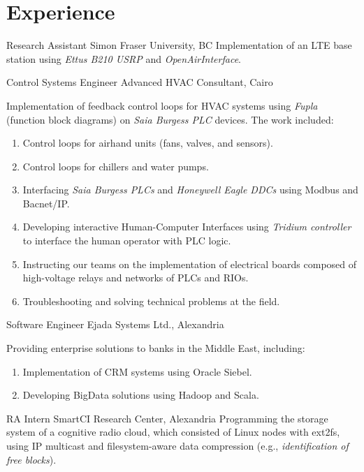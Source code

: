 \documentclass[letterpaper]{twentysecondcv} %
\begin{document}
\section{Experience}

\begin{twenty}
               {Research Assistant}
               {Simon Fraser University, BC}
               {Implementation of an LTE base station using \textit{Ettus B210 USRP} and \textit{OpenAirInterface}.
               }

               {Control Systems Engineer}
               {Advanced HVAC Consultant, Cairo}
               {Implementation of feedback control loops for HVAC systems using \textit{Fupla} (function block diagrams) on 
                \textit{Saia Burgess PLC} devices. The work included:
                \begin{enumerate}
                    \item{Control loops for airhand units (fans, valves, and sensors).}
                    \item{Control loops for chillers and water pumps.}
                    \item{Interfacing \textit{Saia Burgess PLCs} and \textit{Honeywell Eagle DDCs} using 
                          Modbus and Bacnet/IP.}
                    \item{Developing interactive Human-Computer Interfaces using \textit{Tridium controller}
                          to interface the human operator with PLC logic.}
                    \item{Instructing our teams on the implementation of electrical boards composed of
                          high-voltage relays and networks of PLCs and RIOs.}
                    \item{Troubleshooting and solving technical problems at the field.}
                \end{enumerate}
               }

               {Software Engineer}
               {Ejada Systems Ltd., Alexandria}
               {Providing enterprise solutions to banks in the Middle East, including:
                \begin{enumerate}
                    \item Implementation of CRM systems using Oracle Siebel.
                    \item Developing BigData solutions using Hadoop and Scala.
                \end{enumerate}}

               {RA Intern}
               {SmartCI Research Center, Alexandria}
               {Programming the storage system of a cognitive radio cloud, which consisted of
                Linux nodes with ext2fs, using IP multicast and filesystem-aware data compression 
                (e.g., \textit{identification of free blocks}).}

\end{twenty}
\end{document}
